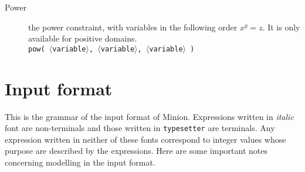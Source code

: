 \documentclass{article}
\begin{document}
\begin{small}
\begin{description}
\item[Power] the power constraint, with variables in the following order $x^y = z$. It is only available for positive domains.\\
\texttt{pow( $\langle$variable$\rangle$,  $\langle$variable$\rangle$,  $\langle$variable$\rangle$ ) }

\end{description}



\clearpage
\section{Input format}\label{sect_input}




This is the grammar of the input format of Minion. Expressions written
in \textit{italic} font are non-terminals and those written in 
\texttt{typesetter} are terminals. Any expression written in neither
of these fonts correspond to integer values whose purpose are
described by the expressions. Here are some important notes concerning
modelling in the input format.

\begin{description}


\end{description}
\end{small}
\end{document}
